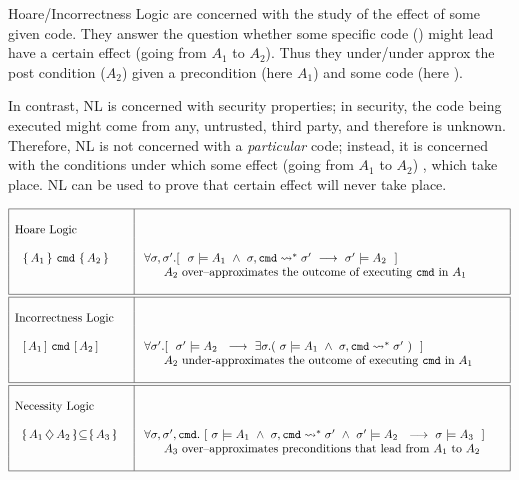 \label{sect:compare}

Hoare/Incorrectness Logic are concerned with the study of the effect of some given code. They answer the question whether some specific code () might lead have a certain effect (going from $A_1$ to $A_2$). Thus they under/under approx the post condition ($A_2$) given a precondition  (here $A_1$) and some code (here ). 

In contrast, NL is concerned with security properties; in security,  the code being executed might come from any, untrusted, third party,
and therefore is unknown. Therefore, NL is not concerned with a \emph{particular} code; instead, it is concerned with the conditions under which some effect  (going from $A_1$ to $A_2$) , which take place. NL can be used to prove that certain effect will never take place.  
\vspace{.2in}

$\begin{array}{|l|l|}
\hline
 & \\
\mbox{Hoare Logic}  &  
\\
 & \\
\ \  \{\, A_1 \, \}\ \prg{cmd} \  \{\, A_2 \, \} \ \ \ &\  \forall \sigma, \sigma'. [ \ \ \sigma \models A_1 \ \wedge\ \sigma, \prg{cmd} \leadsto^* \sigma' \ \longrightarrow \ \sigma' \models A_2\ \  ]  \\
 & \ \ \ \ \ \  A_2 \mbox{ over--approximates the outcome of executing \prg{cmd} in } A_1  \ \ \ \ \ \ \ \ \\
& \\
\hline 
\hline
 & \\
 \mbox{Incorrectness Logic}  &  \\
 & \\
\ \  [\, A_1 \, ]\ \prg{cmd} \  [\, A_2 \, ] \ \ \ &\  \forall \sigma'. [ \ \ \sigma' \models A_2 \ \ \longrightarrow \ \exists \sigma.( \ \sigma \models A_1 \ \wedge\ \sigma, \prg{cmd} \leadsto^* \sigma' \ ) \ \  ]  \\
 &  \ \ \ \ \ \   A_2 \mbox{ under-approximates the outcome of executing  \prg{cmd} in } A_1  \ \ \ \ \ \ \ \ \\
& \\
\hline 
\hline
 & \\
 \mbox{Necessity Logic} & \\
 & \\
\ \ \onlyIf{A_1}{A_2}{A_3}\ \ \ &\  \forall \sigma, \sigma',\prg{cmd}.\ [ \ \sigma \models A_1 \ \wedge\ \sigma, \prg{cmd} \leadsto^* \sigma' \  \wedge\  \sigma' \models A_2 \ \  \longrightarrow \ \sigma \models A_3\ \  ]  \\\

 &  \ \ \ \ \ \   A_3 \mbox{ over--approximates   preconditions that lead from  $A_1$ to $A_2$}  \\
 & \\
\hline
\end{array}
$

